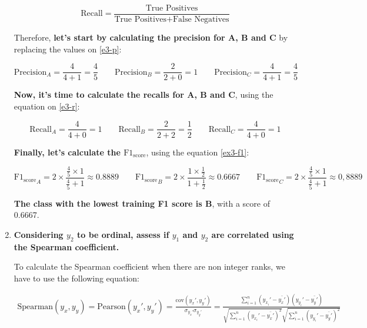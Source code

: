 \documentclass[12pt]{article}
\begin{document}
\begin{enumerate}[leftmargin=\labelsep]
        \begin{equation}\label{e3-r}
          \text{Recall} = \frac{\text{True Positives}}{{\text{True Positives} + \text{False Negatives}}}
        \end{equation}

        Therefore, \textbf{let's start by calculating the precision for A, B and C} by replacing the values on \eqref{e3-p}:

        \begin{equation*}
          \text{Precision}_A = \frac{4}{4+1} = \frac{4}{5} \qquad
          \text{Precision}_B = \frac{2}{2+0} = 1 \qquad
          \text{Precision}_C = \frac{4}{4+1} = \frac{4}{5}
        \end{equation*}

        \textbf{Now, it's time to calculate the recalls for A, B and C}, using the equation on \eqref{e3-r}:

        \begin{equation*}
          \text{Recall}_A = \frac{4}{4+0} = 1 \qquad
          \text{Recall}_B = \frac{2}{2+2} = \frac{1}{2} \qquad
          \text{Recall}_C = \frac{4}{4+0} = 1
        \end{equation*}

        \textbf{Finally, let's calculate the $\text{F1}_{\text{score}}$}, using the equation \eqref{ex3-f1}:

        \begin{equation*}
          \displaystyle
          {\text{F1}_{\text{score}}}_A = 2 \times \frac{{ \frac{4}{5} \times 1 }}{{ \frac{4}{5} + 1 }} \approx 0.8889 \qquad
          {\text{F1}_{\text{score}}}_B = 2 \times \frac{{ 1 \times \frac{1}{2} }}{{ 1 + \frac{1}{2} }} \approx 0.6667 \qquad
          {\text{F1}_{\text{score}}}_C = 2 \times \frac{{ \frac{4}{5} \times 1 }}{{ \frac{4}{5} + 1 }} \approx 0,8889
        \end{equation*}

        \textbf{The class with the lowest training F1 score is B}, with a score of 0.6667.

  \item \textbf{Considering $y_2$ to be ordinal, assess if $y_1$ and $y_2$ are correlated using the Spearman coefficient.}

        \vskip 0.3cm

        To calculate the Spearman coefficient when there are non integer ranks, we have to use the following equation:

        \vskip -0.5cm
        \begin{equation}\label{ex4-sp}
          \begin{split}
            \text{Spearman}(y_x, y_y) = \text{Pearson}(y_x', y_y') = \frac{\text{cov}(y_x', y_y')}{\sigma_{y_x'} \sigma_{y_y'}}
            = \frac{\sum_{i=1}^{n} (y_{x_i}' - \bar{y_x'})(y_{y_i}' - \bar{y_y'})}{\sqrt{\sum_{i=1}^{n} (y_{x_i}' - \bar{y_x'})^2}\sqrt{\sum_{i=1}^{n} (y_{y_i}' - \bar{y_y'})^2}}
          \end{split}
        \end{equation}


\end{enumerate}
\end{document}
